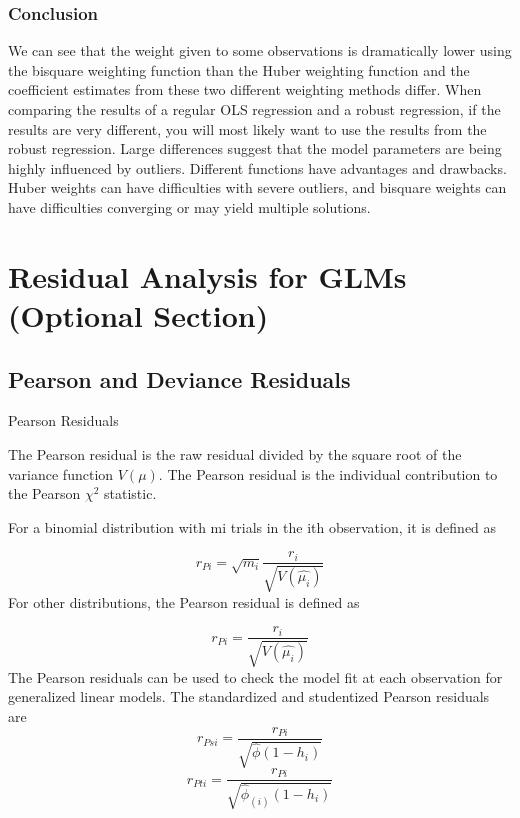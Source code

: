 \subsubsection{Conclusion}
We can see that the weight given to some observations is dramatically lower using the bisquare weighting function than the Huber weighting function and the coefficient estimates from these two different weighting methods differ. 
When comparing the results of a regular OLS regression and a robust regression, if the results are very different, you will most likely want to use the results from the robust regression. 
Large differences suggest that the model parameters are being highly influenced by outliers. Different functions have advantages and drawbacks. Huber weights can have difficulties with severe outliers, and bisquare weights can have difficulties converging or may yield multiple solutions. 




\newpage
\section{Residual Analysis for GLMs (Optional Section)}





\subsection{Pearson and Deviance Residuals} 

Pearson Residuals





The Pearson residual is the raw residual divided by the square root of the variance function $V(\mu).$
The Pearson residual is the individual contribution to the Pearson $\chi^2$ statistic. 

For a binomial distribution with mi trials in the ith observation, it is defined as

\[ r_{Pi} = \sqrt{ m_{i}}
 \frac{r_{i}}{\sqrt{V(\hat{ \mu_{i}})}} \]
For other distributions, the Pearson residual is defined as

\[ r_{Pi} = \frac{r_{i}}{\sqrt{V(\hat{ \mu_{i}})}}\]
The Pearson residuals can be used to check the model fit at each observation for generalized linear models. 
The standardized and studentized Pearson residuals are
\[
r_{Psi} = \frac{r_{Pi}}{\sqrt{\hat{ \phi} (1- h_{i})} } \]
\[ r_{Pti} = \frac{r_{Pi}}{\sqrt{ \hat{ \phi}_{(i)}
 (1- h_{i})} } \]



